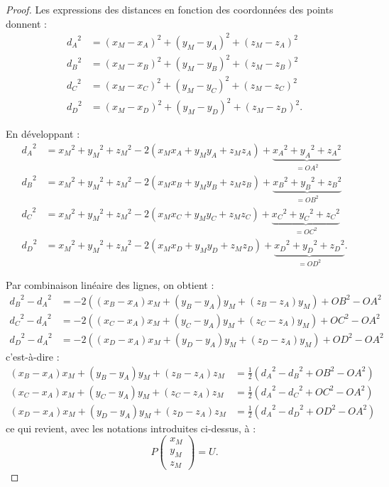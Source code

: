 \documentclass[french, a4paper, 12pt, parskip]{scrartcl}
\begin{document}
\begin{proof}
  Les expressions des distances en fonction des coordonnées des points donnent
  :
  \begin{align*}
    {d_A}^2 &= (x_M - x_A)^2 + (y_M - y_A)^2 + (z_M - z_A)^2 \tag{$L_1$} \\
    {d_B}^2 &= (x_M - x_B)^2 + (y_M - y_B)^2 + (z_M - z_B)^2 \tag{$L_2$} \\
    {d_C}^2 &= (x_M - x_C)^2 + (y_M - y_C)^2 + (z_M - z_C)^2 \tag{$L_3$} \\
    {d_D}^2 &= (x_M - x_D)^2 + (y_M - y_D)^2 + (z_M - z_D)^2. \tag{$L_4$}
  \end{align*}

  En développant :
  \begin{align}
    {d_A}^2 &= {x_M}^2 + {y_M}^2 + {z_M}^2 - 2\left(x_Mx_A + y_My_A + z_Mz_A\right) + \underbrace{{x_A}^2 + {y_A}^2 + {z_A}^2}_{={OA}^2} \tag{$L_1$} \\
    {d_B}^2 &= {x_M}^2 + {y_M}^2 + {z_M}^2 - 2\left(x_Mx_B + y_My_B + z_Mz_B\right) + \underbrace{{x_B}^2 + {y_B}^2 + {z_B}^2}_{={OB}^2} \tag{$L_2$} \\
    {d_C}^2 &= {x_M}^2 + {y_M}^2 + {z_M}^2 - 2\left(x_Mx_C + y_My_C + z_Mz_C\right) + \underbrace{{x_C}^2 + {y_C}^2 + {z_C}^2}_{={OC}^2} \tag{$L_3$} \\
    {d_D}^2 &= {x_M}^2 + {y_M}^2 + {z_M}^2 - 2\left(x_Mx_D + y_My_D + z_Mz_D\right) + \underbrace{{x_D}^2 + {y_D}^2 + {z_D}^2}_{={OD}^2}. \tag{$L_4$}
  \end{align}

  Par combinaison linéaire des lignes, on obtient :
  \begin{align}
    {d_B}^2 - {d_A}^2 &= -2\left((x_B-x_A)x_M + (y_B-y_A)y_M + (z_B-z_A)y_M\right) + {OB}^2 - {OA}^2 \tag{$L_2 - L_1$} \\
    {d_C}^2 - {d_A}^2 &= -2\left((x_C-x_A)x_M + (y_C-y_A)y_M + (z_C-z_A)y_M\right) + {OC}^2 - {OA}^2 \tag{$L_3 - L_1$} \\
    {d_D}^2 - {d_A}^2 &= -2\left((x_D-x_A)x_M + (y_D-y_A)y_M + (z_D-z_A)y_M\right) + {OD}^2 - {OA}^2 \tag{$L_4 - L_1$}
  \end{align}
  c'est-à-dire :
  \begin{align}
    (x_B-x_A)x_M + (y_B-y_A)y_M + (z_B-z_A)z_M &= \frac{1}{2}\left({d_A}^2 - {d_B}^2 + {OB}^2 - {OA}^2\right) \tag{$L_2 - L_1$} \\
    (x_C-x_A)x_M + (y_C-y_A)y_M + (z_C-z_A)z_M &= \frac{1}{2}\left({d_A}^2 - {d_C}^2 + {OC}^2 - {OA}^2\right) \tag{$L_3 - L_1$} \\
    (x_D-x_A)x_M + (y_D-y_A)y_M + (z_D-z_A)z_M &= \frac{1}{2}\left({d_A}^2 - {d_D}^2 + {OD}^2 - {OA}^2\right) \tag{$L_4 - L_1$} 
  \end{align}
  ce qui revient, avec les notations introduites ci-dessus, à :
  \[
    P\begin{pmatrix}x_M\\y_M\\z_M\end{pmatrix} = U.
  \]


\end{proof}
\end{document}
